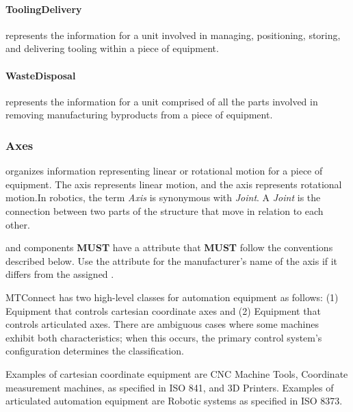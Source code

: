 \paragraph{ToolingDelivery}\mbox{}
\label{sec:ToolingDelivery}


 represents the information for a unit involved in managing, positioning, storing, and delivering tooling within a piece of equipment.



\paragraph{WasteDisposal}\mbox{}
\label{sec:WasteDisposal}


 represents the information for a unit comprised of all the parts involved in removing manufacturing byproducts from a piece of equipment.



\subsubsection{Axes}
\label{sec:Axes}



 organizes information representing linear or rotational motion for a piece of equipment. The  axis  represents linear motion, and the axis  represents rotational motion.In robotics, the term \textit{Axis} is synonymous with \textit{Joint}. A \textit{Joint} is the connection between two parts of the structure that move in relation to each other.

 and  components \textbf{MUST} have a  attribute that \textbf{MUST} follow the conventions described below. Use the  attribute for the manufacturer's name of the axis if it differs from the assigned .

\gls{MTConnect} has two high-level classes for automation equipment as follows: (1) Equipment that controls cartesian coordinate axes and (2) Equipment that controls articulated axes. There are ambiguous cases where some machines exhibit both characteristics; when this occurs, the primary control system's configuration determines the classification.

Examples of cartesian coordinate equipment are CNC Machine Tools, Coordinate measurement machines, as specified in ISO 841, and 3D Printers. Examples of articulated automation equipment are Robotic systems as specified in ISO 8373.


